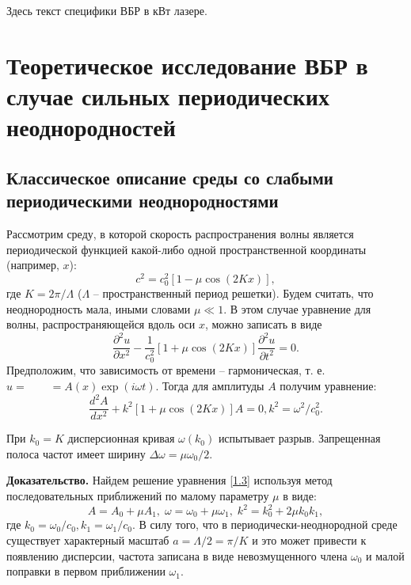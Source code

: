 Здесь текст специфики ВБР в кВт лазере.

\section{Теоретическое исследование ВБР в случае сильных периодических неоднородностей}
\label{sec:fbg_strong_periodic_structure}

\subsection{Классическое описание среды со слабыми периодическими неоднородностями}

Рассмотрим среду, в которой скорость распространения волны является периодической функцией какой-либо одной пространственной координаты (например, $x$):
\begin{equation}\label{1.1}
c^2=c_0^2[1-\mu \cos(2Kx)],
\end{equation}
где $K=2\pi/\Lambda$ ($\Lambda$ -- пространственный период решетки). Будем считать, что неоднородность мала, иными словами $\mu \ll 1$. В этом случае уравнение для волны, распространяющейся вдоль оси $x$, можно записать в виде
\begin{equation}\label{1.2}
\frac{\partial^2 u}{\partial x^2}-\frac{1}{c_0^2}\left[1+\mu\cos(2Kx) \right]\frac{\partial^2 u}{\partial t^2}=0.
\end{equation}
Предположим, что зависимость от времени -- гармоническая, т. е. $u = \qquad =A(x)\exp(i\omega t)$. Тогда для амплитуды $A$ получим уравнение:
\begin{equation}\label{1.3}
\frac{d^2 A}{dx^2}+k^2\left[1+\mu\cos(2Kx) \right]A=0,
k^2=\omega^2/c_0^2.
\end{equation}
\begin{utv}
При $k_0=K$ дисперсионная кривая $\omega(k_0)$ испытывает разрыв. Запрещенная полоса частот имеет ширину $\Delta\omega=\mu\omega_0/2$.
\end{utv}
\textbf{Доказательство.}
Найдем решение уравнения \eqref{1.3} используя метод последовательных приближений по малому параметру $\mu$ в виде:
\begin{equation}\label{1.4}
A=A_0+\mu A_1,\;\omega=\omega_0+\mu \omega_1,\; k^2=k_0^2+2\mu k_0k_1,
\end{equation}
где $k_0=\omega_0/c_0, k_1=\omega_1/c_0$. В силу того, что в периодически-неоднородной среде существует характерный масштаб $a=\Lambda/2=\pi/K$ и это может привести к появлению дисперсии, частота записана в виде невозмущенного члена $\omega_0$ и малой поправки в первом приближении $\omega_1$.


